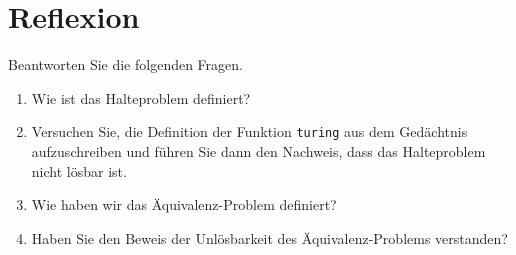 \section{Reflexion}
Beantworten Sie die folgenden Fragen.
\begin{enumerate}
\item Wie ist das Halteproblem definiert?
\item Versuchen Sie, die Definition der Funktion \texttt{turing} aus dem Gedächtnis aufzuschreiben und führen Sie
      dann den Nachweis, dass das Halteproblem nicht lösbar ist.
\item Wie haben wir das Äquivalenz-Problem definiert?
\item Haben Sie den Beweis der Unlösbarkeit des Äquivalenz-Problems verstanden?
\end{enumerate}


